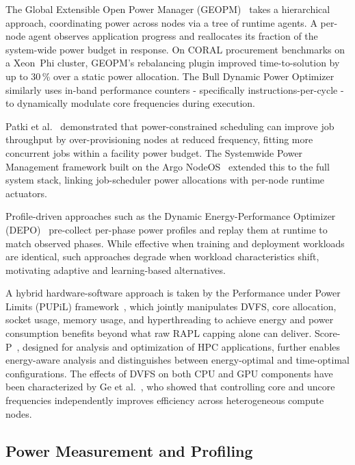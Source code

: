 The Global Extensible Open Power Manager
(GEOPM)~\cite{eastep2017global} takes a hierarchical approach, coordinating
power across nodes via a tree of runtime agents.  A per-node agent observes
application progress and reallocates its fraction of the system-wide power
budget in response.  On CORAL procurement benchmarks on a Xeon~Phi cluster,
GEOPM's rebalancing plugin improved time-to-solution by up to 30\,\% over
a static power allocation.
The Bull Dynamic Power Optimizer~\cite{8514915} similarly uses in-band
performance counters - specifically instructions-per-cycle - to
dynamically modulate core frequencies during execution.

Patki et al.~\cite{patki2015practical} demonstrated that power-constrained
scheduling can improve job throughput by over-provisioning nodes at reduced
frequency, fitting more concurrent jobs within a facility power budget.
The Systemwide Power Management framework built on the Argo NodeOS~\cite{Ellsworth:16:Systemwide}
extended this to the full system stack, linking job-scheduler power allocations
with per-node runtime actuators.

Profile-driven approaches such as the Dynamic Energy-Performance
Optimizer (DEPO)~\cite{KRZYWANIAK2023396} pre-collect per-phase power
profiles and replay them at runtime to match observed phases.
While effective when training and deployment workloads are identical,
such approaches degrade when workload characteristics shift, motivating
adaptive and learning-based alternatives.

A hybrid hardware-software approach is taken by the Performance under Power Limits
(PUPiL) framework~\cite{zhang2016maximizing}, which jointly manipulates DVFS, core
allocation, socket usage, memory usage, and hyperthreading to achieve energy and
power consumption benefits beyond what raw RAPL capping alone can deliver.
Score-P~\cite{czarnul2019energy}, designed for analysis and optimization of HPC
applications, further enables energy-aware analysis and distinguishes between
energy-optimal and time-optimal configurations.
The effects of DVFS on both CPU and GPU components have been characterized
by Ge et al.~\cite{ge2013effects}, who showed that controlling core and uncore
frequencies independently improves efficiency across heterogeneous compute nodes.

\subsection{Power Measurement and Profiling}

